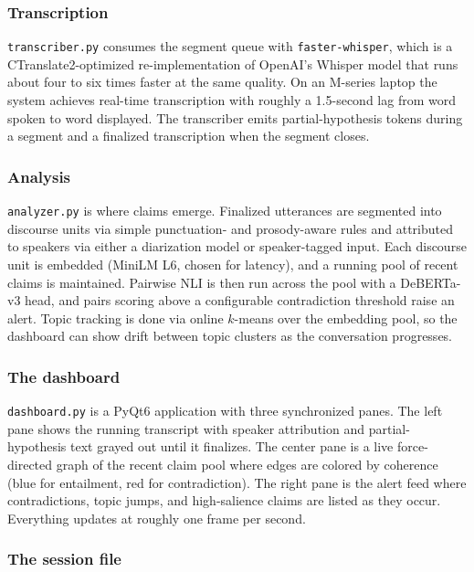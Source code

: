 \documentclass[11pt]{article}
\begin{document}
\subsubsection{Transcription}

\texttt{transcriber.py} consumes the segment queue with \texttt{faster-whisper}, which is a CTranslate2-optimized re-implementation of OpenAI's Whisper model that runs about four to six times faster at the same quality. On an M-series laptop the system achieves real-time transcription with roughly a 1.5-second lag from word spoken to word displayed. The transcriber emits partial-hypothesis tokens during a segment and a finalized transcription when the segment closes.

\subsubsection{Analysis}

\texttt{analyzer.py} is where claims emerge. Finalized utterances are segmented into discourse units via simple punctuation- and prosody-aware rules and attributed to speakers via either a diarization model or speaker-tagged input. Each discourse unit is embedded (MiniLM L6, chosen for latency), and a running pool of recent claims is maintained. Pairwise NLI is then run across the pool with a DeBERTa-v3 head, and pairs scoring above a configurable contradiction threshold raise an alert. Topic tracking is done via online $k$-means over the embedding pool, so the dashboard can show drift between topic clusters as the conversation progresses.

\subsubsection{The dashboard}

\texttt{dashboard.py} is a PyQt6 application with three synchronized panes. The left pane shows the running transcript with speaker attribution and partial-hypothesis text grayed out until it finalizes. The center pane is a live force-directed graph of the recent claim pool where edges are colored by coherence (blue for entailment, red for contradiction). The right pane is the alert feed where contradictions, topic jumps, and high-salience claims are listed as they occur. Everything updates at roughly one frame per second.

\subsubsection{The session file}
\end{document}
